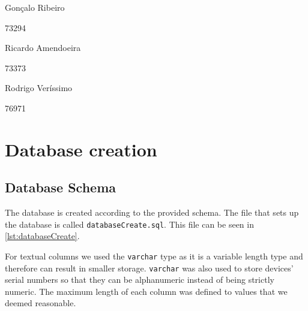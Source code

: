 \documentclass[a4paper,11pt]{article}
\begin{document}









\trSetAuthors
{
    \begin{center}
	Gonçalo Ribeiro

	73294
    \end{center}
}{
    \begin{center}
	Ricardo Amendoeira

	73373
    \end{center}
}{
    \begin{center}
	Rodrigo Veríssimo

	76971
    \end{center}
}


\trMakeCover

\restoregeometry
{}

\tableofcontents
{}

\pagebreak

\setcounter{page}{1}



\section{Database creation}

\subsection{Database Schema}

The database is created according to the provided schema. The file that sets up the database is  called \texttt{databaseCreate.sql}. This file can be seen in \autoref{lst:databaseCreate}.

For textual columns we used the \texttt{varchar} type as it is a variable length type and therefore can result in smaller storage. \texttt{varchar} was also used to store devices' serial numbers so that they can be alphanumeric instead of being strictly numeric. The maximum length of each column was defined to values that we deemed reasonable.
\end{document}
